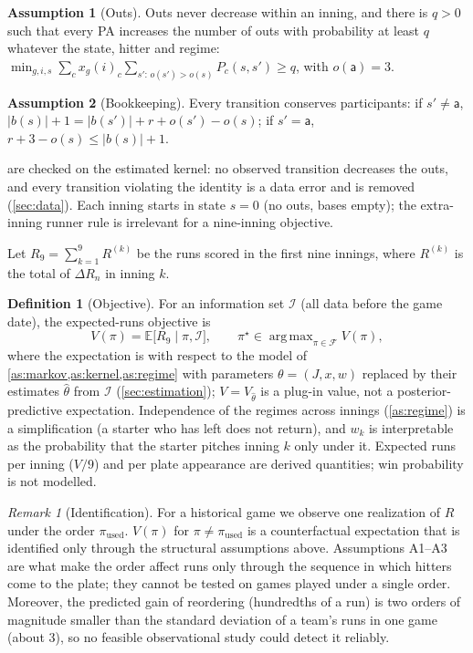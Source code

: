 \documentclass[11pt]{article}
\theoremstyle{definition}
\newtheorem{definition}{Definition}
\newtheorem{assumption}{Assumption}
\theoremstyle{remark}
\newtheorem{remark}{Remark}
\newcommand{\E}{\mathbb{E}}
\newcommand{\cF}{\mathcal{F}}
\newcommand{\cI}{\mathcal{I}}
\newcommand{\abs}{\mathsf{a}}
\DeclareMathOperator*{\argmax}{arg\,max}
\begin{document}
\begin{assumption}[Outs]\label{as:outs}
Outs never decrease within an inning, and there is $q>0$ such that every PA increases the number
of outs with probability at least $q$ whatever the state, hitter and regime:
$\min_{g,i,s}\sum_{c}x_g(i)_c\sum_{s':\,o(s')>o(s)}P_c(s,s')\ge q$, with $o(\abs)=3$.
\end{assumption}

\begin{assumption}[Bookkeeping]\label{as:bookkeeping}
Every transition conserves participants: if $s'\ne\abs$, $|b(s)|+1=|b(s')|+r+o(s')-o(s)$; if
$s'=\abs$, $r+3-o(s)\le|b(s)|+1$.
\end{assumption}

 are checked on the estimated kernel: no observed transition decreases
the outs, and every transition violating the identity is a data error and is removed
(\cref{sec:data}). Each inning starts in state $s=0$ (no outs, bases empty); the extra-inning
runner rule is irrelevant for a nine-inning objective.

Let $R_9=\sum_{k=1}^9 R^{(k)}$ be the runs scored in the first nine innings, where $R^{(k)}$ is the
total of $\Delta R_n$ in inning $k$.

\begin{definition}[Objective]
For an information set $\cI$ (all data before the game date), the expected-runs objective is
\[
V(\pi)=\E\bigl[R_9\mid \pi,\cI\bigr],\qquad \pi^\star\in\argmax_{\pi\in\cF}V(\pi),
\]
where the expectation is with respect to the model of \cref{as:markov,as:kernel,as:regime} with
parameters $\theta=(J,x,w)$ replaced by their estimates $\hat\theta$ from $\cI$
(\cref{sec:estimation}); $V=V_{\hat\theta}$ is a plug-in value, not a posterior-predictive
expectation. Independence of the regimes across innings (\cref{as:regime}) is a simplification
(a starter who has left does not return), and $w_k$ is interpretable as the probability that the
starter pitches inning $k$ only under it. Expected runs per inning
($V/9$) and per plate appearance are derived quantities; win probability is not modelled.
\end{definition}

\begin{remark}[Identification]\label{rem:identification}
For a historical game we observe one realization of $R$ under the order $\pi_{\mathrm{used}}$.
$V(\pi)$ for $\pi\ne\pi_{\mathrm{used}}$ is a counterfactual expectation that is identified only
through the structural assumptions above. Assumptions A1--A3 are what make the order affect runs
only through the sequence in which hitters come to the plate; they cannot be tested on games
played under a single order. Moreover, the predicted gain of reordering (hundredths of a run) is
two orders of magnitude smaller than the standard deviation of a team's runs in one game
(about 3), so no feasible observational study could detect it reliably.
\end{remark}
\end{document}
